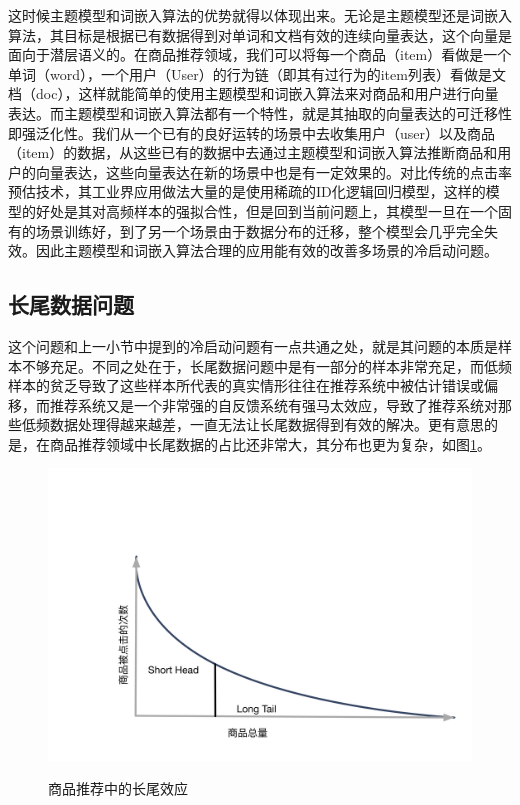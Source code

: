 这时候主题模型和词嵌入算法的优势就得以体现出来。无论是主题模型还是词嵌入算法，其目标是根据已有数据得到对单词和文档有效的连续向量表达，这个向量是面向于潜层语义的。在商品推荐领域，我们可以将每一个商品（item）看做是一个单词（word），一个用户（User）的行为链（即其有过行为的item列表）看做是文档（doc），这样就能简单的使用主题模型和词嵌入算法来对商品和用户进行向量表达。而主题模型和词嵌入算法都有一个特性，就是其抽取的向量表达的可迁移性即强泛化性。我们从一个已有的良好运转的场景中去收集用户（user）以及商品（item）的数据，从这些已有的数据中去通过主题模型和词嵌入算法推断商品和用户的向量表达，这些向量表达在新的场景中也是有一定效果的。对比传统的点击率预估技术，其工业界应用做法大量的是使用稀疏的ID化逻辑回归模型，这样的模型的好处是其对高频样本的强拟合性，但是回到当前问题上，其模型一旦在一个固有的场景训练好，到了另一个场景由于数据分布的迁移，整个模型会几乎完全失效。因此主题模型和词嵌入算法合理的应用能有效的改善多场景的冷启动问题。

\subsection{长尾数据问题}
这个问题和上一小节中提到的冷启动问题有一点共通之处，就是其问题的本质是样本不够充足。不同之处在于，长尾数据问题中是有一部分的样本非常充足，而低频样本的贫乏导致了这些样本所代表的真实情形往往在推荐系统中被估计错误或偏移，而推荐系统又是一个非常强的自反馈系统有强马太效应，导致了推荐系统对那些低频数据处理得越来越差，一直无法让长尾数据得到有效的解决。更有意思的是，在商品推荐领域中长尾数据的占比还非常大，其分布也更为复杂，如图\ref{fig:LongTail}。
\begin{figure}[!h]
\centering
  \includegraphics[width=1.0\textwidth]{./graph/LongTail.png}\\
  \caption{商品推荐中的长尾效应}
\label{fig:LongTail}
\end{figure}

